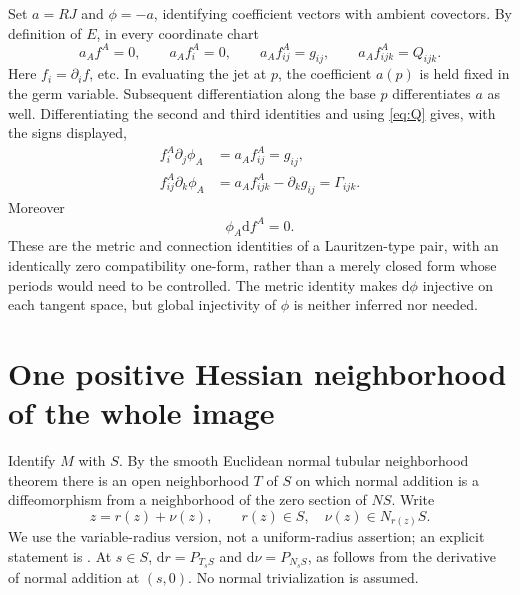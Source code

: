\documentclass[10pt,letterpaper]{article}
\newcommand{\dd}{\mathrm d}
\begin{document}
Set $a=RJ$ and $\phi=-a$, identifying coefficient vectors with ambient
covectors. By definition of $E$, in every coordinate chart
\begin{equation}\label{eq:jetidentities}
 a_A f^A=0,\qquad a_A f_i^A=0,\qquad
 a_A f_{ij}^A=g_{ij},\qquad a_A f_{ijk}^A=Q_{ijk}.
\end{equation}
Here $f_i=\partial_i f$, etc. In evaluating the jet at $p$, the coefficient
$a(p)$ is held fixed in the germ variable. Subsequent differentiation along
the base $p$ differentiates $a$ as well. Differentiating the second and
third identities and using \eqref{eq:Q} gives, with the signs displayed,
\begin{align}
 f_i^A\partial_j\phi_A
   &=a_A f_{ij}^A=g_{ij},\label{eq:pairmetric}\\
 f_{ij}^A\partial_k\phi_A
   &=a_A f_{ijk}^A-\partial_k g_{ij}=\Gamma_{ijk}.
   \label{eq:pairconnection}
\end{align}
Moreover
\begin{equation}\label{eq:zeroform}
 \phi_A\dd f^A=0.
\end{equation}
These are the metric and connection identities of a Lauritzen-type pair,
with an identically zero compatibility one-form, rather than a merely
closed form whose periods would need to be controlled. The metric identity
makes $\dd\phi$ injective on each tangent space, but global injectivity of
$\phi$ is neither inferred nor needed.

\section{One positive Hessian neighborhood of the whole image}

Identify $M$ with $S$. By the smooth Euclidean normal tubular neighborhood
theorem there is an open neighborhood $T$ of $S$ on which normal addition
is a diffeomorphism from a neighborhood of the zero section of $NS$.
Write
\[
 z=r(z)+\nu(z),\qquad r(z)\in S,\quad \nu(z)\in N_{r(z)}S.
\]
We use the variable-radius version, not a uniform-radius assertion; an
explicit statement is \cite[Definition~3.53 and Theorem~3.54, pp.~43--44]{Tube}.
At $s\in S$, $\dd r=P_{T_sS}$ and $\dd\nu=P_{N_sS}$, as follows from
the derivative of normal addition at $(s,0)$. No normal trivialization is
assumed.
\end{document}

